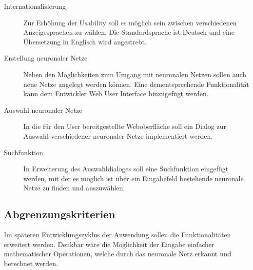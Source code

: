 \begin{description}
\item [Internationalisierung]
Zur Erhöhung der Usability soll es möglich sein zwischen verschiedenen Anzeigesprachen zu wählen. Die Standardsprache ist Deutsch und eine Übersetzung in Englisch wird angestrebt.
\item [Erstellung neuronaler Netze]
Neben den Möglichkeiten zum Umgang mit neuronalen Netzen sollen auch neue Netze angelegt werden können. Eine dementsprechende Funktionalität kann dem Entwickler Web User Interface hinzugefügt werden. 
\item [Auswahl neuronaler Netze] 
In die für den User bereitgestellte Weboberfläche soll ein Dialog zur Auswahl verschiedener neuronaler Netze implementiert werden.
\item [Suchfunktion]
In Erweiterung des Auswahldialoges soll eine Suchfunktion eingefügt werden, mit der es möglich ist über ein Eingabefeld bestehende neuronale Netze zu finden und auszuwählen.
\end{description}

 
\subsection{Abgrenzungskriterien}
Im späteren Entwicklungszyklus der Anwendung sollen die Funktionalitäten erweitert werden. Denkbar wäre die Möglichkeit
der Eingabe einfacher mathematischer Operationen, welche durch das neuronale Netz erkannt und berechnet werden.
